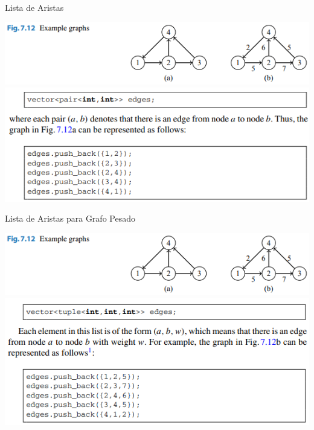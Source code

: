\documentclass{beamer}
\begin{document}
\begin{frame}{Lista de Aristas}
	\begin{center}
		\includegraphics[]{figuras/7.12-grafo-ejemplo.PNG}
		\includegraphics[]{figuras/lista-de-aristas.PNG}
	\end{center}
\end{frame}

\begin{frame}{Lista de Aristas para Grafo Pesado}
	\begin{center}
		\includegraphics[]{figuras/7.12-grafo-ejemplo.PNG}
		\includegraphics[]{figuras/lista-de-aristas-pesado.PNG}
	\end{center}
\end{frame}
\end{document}
